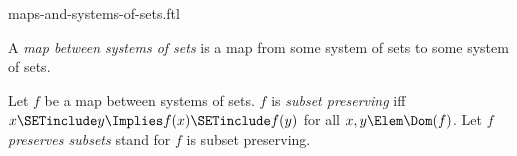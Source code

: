 \documentclass{stex}
\begin{document}
\begin{smodule}{maps-and-systems-of-sets.ftl}

\begin{definition}[forthel,for=map between systems of sets]
  A \emph{map between systems of sets} is a map from some system of sets to some system of sets.
\end{definition}

\begin{definition}[forthel,for={subset preserving,preserve subsets}]
  Let $f$ be a map between systems of sets.
  $f$ is \emph{subset preserving} iff $x \SETinclude y \Implies f(x) \SETinclude f(y)$ for all $x, y \Elem \Dom(f)$.
  Let $f$ \emph{preserves subsets} stand for $f$ is subset preserving.
\end{definition}
\end{smodule}
\end{document}
